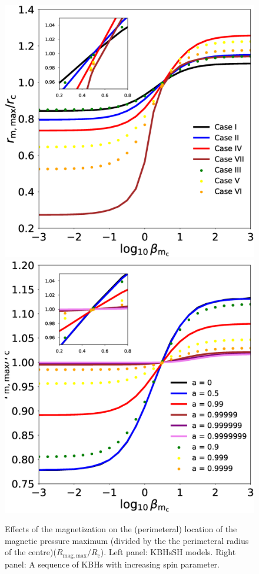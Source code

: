\documentclass[twocolumn,aps,showpacs,showkeys,prd,superscriptaddress,byrevtex, amsmath]{revtex4-1}
\begin{document}
\begin{figure}
\centering
\includegraphics[scale=0.2]{figures/fig8_HBH.eps}
\hspace{0.5cm}
\includegraphics[scale=0.2]{figures/fig8_Kerr.eps}
\hspace{0.5cm}
\caption{Effects of the magnetization on the (perimeteral) location of the magnetic pressure maximum (divided by the the perimeteral radius of the centre)($R_{\mathrm{mag}, \mathrm{max}} / R_{\mathrm{c}}$). Left panel: KBHsSH models. Right panel: A sequence of KBHs with increasing spin parameter.}
\label{comparison_HBH_Kerr_r_m_max}
\end{figure}
\end{document}
